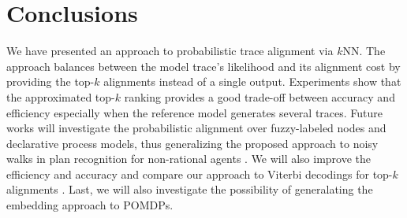 
\section{Conclusions}
\label{sec:conclusion}

We have presented an approach to probabilistic trace alignment via $k$NN.
The approach balances between the model trace's likelihood  and its alignment cost by providing the top-$k$ 
alignments instead of a single output. Experiments show that the approximated top-$k$ ranking provides a good 
trade-off between accuracy and efficiency especially when the reference model generates several traces.
Future works will investigate the probabilistic alignment over fuzzy-labeled nodes and declarative process models, thus 
generalizing the proposed approach to noisy walks in plan recognition for non-rational agents \cite{RamirezG10}. We will also improve 
the efficiency and accuracy and compare our approach to %
  Viterbi decodings for top-$k$ alignments \cite{577040}. Last, we will also 
investigate the possibility of generalating the embedding approach to POMDPs.

